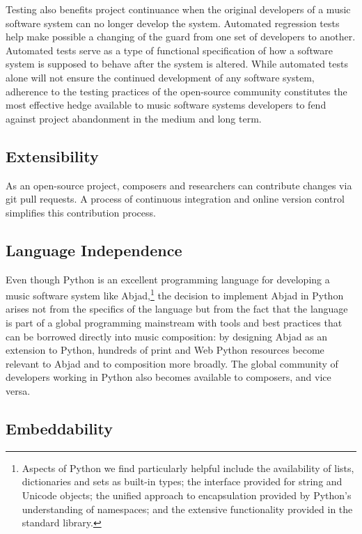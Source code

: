 \documentclass{article}
\begin{document}
Testing also benefits project continuance when the original developers of a
music software system can no longer develop the system. Automated regression
tests help make possible a changing of the guard from one set of developers to
another. Automated tests serve as a type of functional specification of how a
software system is supposed to behave after the system is altered. While
automated tests alone will not ensure the continued development of any software
system, adherence to the testing practices of the open-source community
constitutes the most effective hedge available to music software systems
developers to fend against project abandonment in the medium and long term.

\subsection{Extensibility}

As an open-source project, composers and researchers can contribute changes via
git pull requests. A process of continuous integration and online version
control simplifies this contribution process.

\subsection{Language Independence}

Even though Python is an excellent programming language for developing a music
software system like Abjad,\footnote{Aspects of Python we find particularly
helpful include the availability of lists, dictionaries and sets as built-in
types; the interface provided for string and Unicode objects; the unified
approach to encapsulation provided by Python's understanding of namespaces; and
the extensive functionality provided in the standard library.} the decision to
implement Abjad in Python arises not from the specifics of the language but
from the fact that the language is part of a global programming mainstream with
tools and best practices that can be borrowed directly into music composition:
by designing Abjad as an extension to Python, hundreds of print and Web Python
resources become relevant to Abjad and to composition more broadly. The global
community of developers working in Python also becomes available to composers,
and vice versa.

\subsection{Embeddability}
\end{document}
